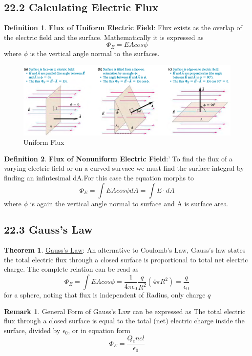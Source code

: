 \documentclass[12pt]{amsart}
\theoremstyle{definition}
\newtheorem{theorem}{Theorem}  %
\newtheorem{definition}{Definition} %
\newtheorem*{remark}{Remark}        %
\numberwithin{equation}{theorem}    %
\begin{document}
\subsection*{22.2 Calculating Electric Flux}

\begin{definition}
    \textbf{Flux of Uniform Electric Field}:
    Flux exists as the overlap of the
    electric field and the surface. Mathematically it is expressed as 
    $$\Phi_E = EAcos\phi$$ where $\phi$ is the vertical angle normal to the surfaces.
\end{definition}

\begin{figure}[H]
    \centering
    \includegraphics[width=5in]{Media/Uniformflux.png}
    \caption{Uniform Flux}
    \label{Uniform Flux}
\end{figure}

\begin{definition}
    \textbf{Flux of Nonuniform Electric Field}:'
    To find the flux of a varying electric field or on a curved survace we must
    find the surface integral by finding an infintesimal dA.For this case the 
    equation morphs to $$\Phi_E = \int EAcos\phi dA = \int E \cdot dA$$ where 
    $\phi$ is again the vertical angle normal to surface and A is surface area.
\end{definition}

\subsection*{22.3 Gauss's Law}

\begin{theorem}
    \underline{Gauss's Law}:
    An alternative to Coulomb's Law, Gauss's law states the total electric flux
    through a closed surface is proportional to total net electric charge. The
    complete relation can be read as 
    $$\Phi_E = \int EA cos\phi = \frac{1}{4\pi \epsilon_0} \frac{q}{R^2}(4\pi R^2) = \frac{q}{\epsilon_0}$$
    for a sphere, noting that flux is independent of Radius, only charge $q$


    \begin{remark}
        General Form of Gauss's Law can be expressed as The total electric 
        flux through a closed surface is equal to the total (net) electric 
        charge inside the surface, divided by $\epsilon_0$, or in equation form 
        $$\Phi_E = \frac{Q_encl}{\epsilon_0}$$
    \end{remark}
\end{theorem}
\end{document}
